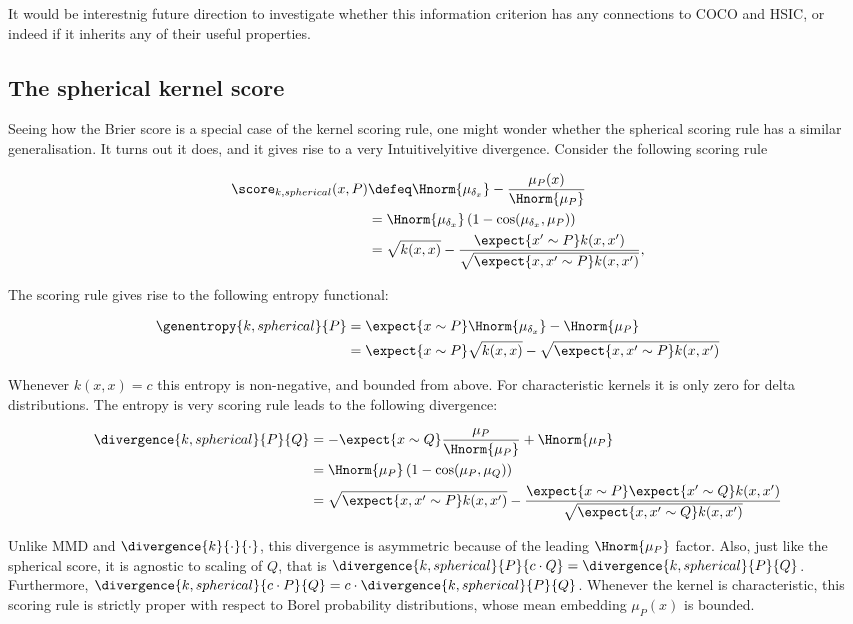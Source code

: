 It would be interestnig future direction to investigate whether this information criterion has any connections to COCO and HSIC, or indeed if it inherits any of their useful properties.

\subsection{The spherical kernel score\label{sec:spherical_kernel_score}}

Seeing how the Brier score is a special case of the kernel scoring rule, one might wonder whether the spherical scoring rule has a similar generalisation. It turns out it does, and it gives rise to a very Intuitivelyitive divergence. Consider the following scoring rule

\begin{align}
	\score_{k,spherical}(x,P) &\defeq \Hnorm{\mu_{\delta_x}} - \frac{\mu_P(x)}{\Hnorm{\mu_P}}\\
			& = \Hnorm{\mu_{\delta_x}}\left(1 - \cos(\mu_{\delta_x},\mu_{P})\right)\\
		& =\sqrt{k(x,x)} - \frac{\expect{x'\sim P}k(x,x')}{\sqrt{\expect{x,x'\sim P}k(x,x')}},
\end{align}

The scoring rule gives rise to the following entropy functional:

\begin{align}
	\genentropy{k,spherical}{P} & = \expect{x\sim P}\Hnorm{\mu_{\delta_x}} - \Hnorm{\mu_P}\\
		& = \expect{x\sim P}\sqrt{k(x,x)} - \sqrt{\expect{x,x'\sim P}k(x,x')}
\end{align}

Whenever $k(x,x)=c$ this entropy is non-negative, and bounded from above. For characteristic kernels it is only zero for delta distributions. The entropy is very scoring rule leads to the following divergence:

\begin{align}
	\divergence{k,spherical}{P}{Q} &= - \expect{x\sim Q}\frac{\mu_P}{\Hnorm{\mu_P}} + \Hnorm{\mu_P}\\
		&= \Hnorm{\mu_P} \left( 1 - \cos(\mu_P, \mu_Q)\right)\\
		&= \sqrt{\expect{x,x'\sim P}k(x,x')} - \frac{\expect{x\sim P}\expect{x'\sim Q}k(x,x')}{\sqrt{\expect{x,x'\sim Q}k(x,x')}} \label{eqn:spherical_kernel_divergence}
\end{align}

Unlike MMD and $\divergence{k}{\cdot}{\cdot}$, this divergence is asymmetric because of the leading $\Hnorm{\mu_P}$ factor. Also, just like the spherical score, it is agnostic to scaling of $Q$, that is $\divergence{k,spherical}{P}{c\cdot Q} = \divergence{k,spherical}{P}{Q}$. Furthermore, $\divergence{k,spherical}{c\cdot P}{Q} = c \cdot \divergence{k,spherical}{P}{Q}$. Whenever the kernel is characteristic, this scoring rule is strictly proper with respect to Borel probability distributions, whose mean embedding $\mu_P(x)$ is bounded.

